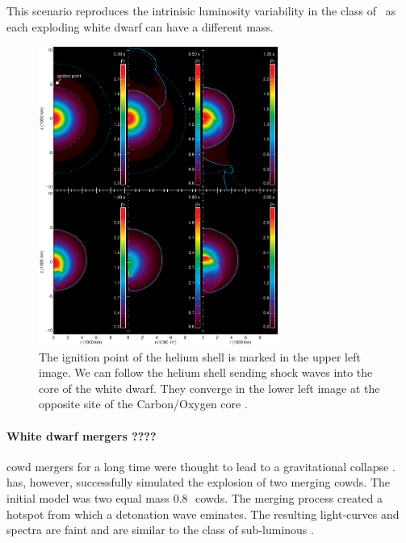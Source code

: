 This scenario reproduces the intrinisic luminosity variability in the class of \snia\ as each exploding white dwarf can have a different mass. 

\begin{figure}[htbp] %
   \centering
   \includegraphics[width=0.7\textwidth]{chapter_intro/plots/fink2010.pdf} 
   \caption{The ignition point of the helium shell is marked in the upper left image. We can follow the helium shell sending shock waves into the core of the white dwarf. They converge in the lower left image at the opposite site of the Carbon/Oxygen core \citep[data from][figure kindly provided by Michael Fink]{2010A&A...514A..53F}. }
   \label{fig:subch_fink2010}
\end{figure}

\paragraph{White dwarf mergers ????}
\gls{cowd} mergers for a long time were thought to lead to a gravitational collapse \citep[same mechanism as the ][]{1985A&A...150L..21S}. \citet{2010Natur.463...61P} has, however, successfully simulated the explosion of two merging \glspl{cowd}. The initial model was two equal mass 0.8\,\msun\ \glspl{cowd}. The merging process created a hotspot from which a detonation wave eminates. 
The resulting light-curves and spectra are faint and are similar to the class of sub-luminous \snia. 


